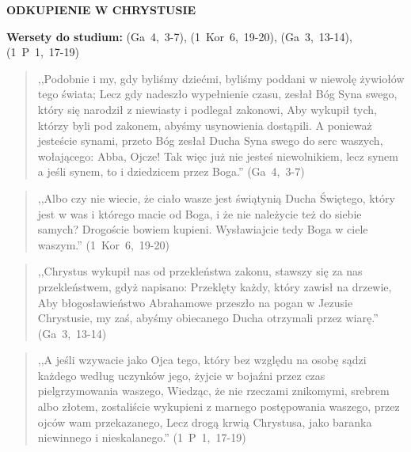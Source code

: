 \documentclass[10pt,a4paper,oneside]{article}
\begin{document}
\centerline{\textbf{\MakeUppercase{Odkupienie w Chrystusie}}}
\begin{center}
\textbf{Wersety do studium:} (Ga~4,~3-7), (1~Kor~6,~19-20), (Ga~3,~13-14), (1~P~1,~17-19)
\end{center}
\begin{quote}
,,Podobnie i my, gdy byliśmy dziećmi, byliśmy poddani w niewolę żywiołów tego świata; Lecz gdy nadeszło wypełnienie czasu, zesłał Bóg Syna swego, który się narodził z niewiasty i podlegał zakonowi, Aby wykupił tych, którzy byli pod zakonem, abyśmy usynowienia dostąpili. A ponieważ jesteście synami, przeto Bóg zesłał Ducha Syna swego do serc waszych, wołającego: Abba, Ojcze! Tak więc już nie jesteś niewolnikiem, lecz synem a jeśli synem, to i dziedzicem przez Boga.'' (Ga~4,~3-7)
\end{quote}
\begin{quote}
,,Albo czy nie wiecie, że ciało wasze jest świątynią Ducha Świętego, który jest w was i którego macie od Boga, i że nie należycie też do siebie samych? Drogoście bowiem kupieni. Wysławiajcie tedy Boga w ciele waszym.'' (1~Kor~6,~19-20)
\end{quote}
\begin{quote}
,,Chrystus wykupił nas od przekleństwa zakonu, stawszy się za nas przekleństwem, gdyż napisano: Przeklęty każdy, który zawisł na drzewie, Aby błogosławieństwo Abrahamowe przeszło na pogan w Jezusie Chrystusie, my zaś, abyśmy obiecanego Ducha otrzymali przez wiarę.'' (Ga~3,~13-14)
\end{quote}
\begin{quote}
,,A jeśli wzywacie jako Ojca tego, który bez względu na osobę sądzi każdego według uczynków jego, żyjcie w bojaźni przez czas pielgrzymowania waszego, Wiedząc, że nie rzeczami znikomymi, srebrem albo złotem, zostaliście wykupieni z marnego postępowania waszego, przez ojców wam przekazanego, Lecz drogą krwią Chrystusa, jako baranka niewinnego i nieskalanego.'' (1~P~1,~17-19)
\end{quote}
\end{document}
